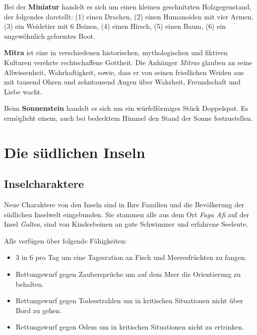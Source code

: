 \documentclass[11pt]{wbzine}
\begin{document}
\begin{multicols}{2}

    Bei der \textbf{Miniatur} handelt es sich um einen kleinen
    geschnitzten Holzgegenstand, der folgendes darstellt: (1) einen
    Drachen, (2) einen Humanoiden mit vier Armen, (3) ein Weidetier mit
    6 Beinen, (4) einen Hirsch, (5) einen Baum, (6) ein ungewöhnlich
    geformtes Boot.

    \textbf{Mitra} ist eine in verschiedenen historischen, mythologischen und
    fiktiven Kulturen verehrte rechtschaffene Gottheit. Die Anhänger
    \textit{Mitras} glauben an seine Allwissenheit, Wahrhaftigkeit,
    sowie, dass er von seinen friedlichen Weiden aus mit tausend
    Ohren und zehntausend Augen über Wahrheit, Freundschaft und
    Liebe wacht.

    Beim \textbf{Sonnenstein} handelt es sich um ein würfelförmiges
    Stück Doppelspat. Es ermöglicht einem, auch bei bedecktem
    Himmel den Stand der Sonne festzustellen.


\section{Die südlichen Inseln}


\subsection{Inselcharaktere}

    Neue Charaktere von den Inseln sind in Ihre Familien und die
    Bevölkerung der südlichen Inselwelt eingebunden. Sie stammen
    alle aus dem Ort \textit{Faga Afi} auf der Insel
    \textit{Galtea}, sind von Kindesbeinen an gute Schwimmer und
    erfahrene Seeleute. 

Alle verfügen über folgende Fähigkeiten:

\begin{itemize}
    \item 3 in 6 pro Tag um eine Tagesration an Fisch und Meeresfrüchten zu
fangen.

\item Rettungswurf gegen Zaubersprüche um auf dem Meer die Orientierung
zu behalten.

\item Rettungswurf gegen Todesstrahlen um in kritischen Situationen
nicht über Bord zu gehen.

\item Rettungswurf gegen Odem um in kritischen Situationen nicht zu
ertrinken.
\end{itemize}


\end{multicols}
\end{document}
